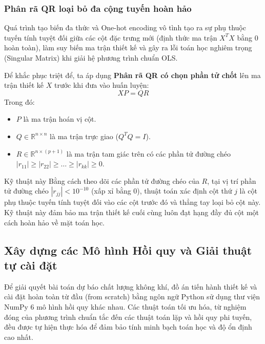 \documentclass[12pt,a4paper]{article}
\begin{document}
\subsubsection{Phân rã QR loại bỏ đa cộng tuyến hoàn hảo}
Quá trình tạo biến đa thức và One-hot encoding vô tình tạo ra sự phụ thuộc tuyến tính tuyệt đối giữa các cột đặc trưng mới (định thức ma trận $X^T X$ bằng 0 hoàn toàn), làm suy biến ma trận thiết kế và gây ra lỗi toán học nghiêm trọng (Singular Matrix) khi giải hệ phương trình chuẩn OLS.

Để khắc phục triệt để, ta áp dụng \textbf{Phân rã QR có chọn phần tử chốt} lên ma trận thiết kế $X$ trước khi đưa vào huấn luyện:
\begin{equation}
    X P = Q R
\end{equation}
Trong đó:
\begin{itemize}
    \item $P$ là ma trận hoán vị cột.
    \item $Q \in \mathbb{R}^{n \times n}$ là ma trận trực giao ($Q^T Q = I$).
    \item $R \in \mathbb{R}^{n \times (p+1)}$ là ma trận tam giác trên có các phần tử đường chéo $|r_{11}| \ge |r_{22}| \ge \dots \ge |r_{kk}| \ge 0$.
\end{itemize} Kỹ thuật này 
Bằng cách theo dõi các phần tử đường chéo của $R$, tại vị trí phần tử đường chéo $|r_{jj}| < 10^{-10}$ (xấp xỉ bằng 0), thuật toán xác định cột thứ $j$ là cột phụ thuộc tuyến tính tuyệt đối vào các cột trước đó và thẳng tay loại bỏ cột này. Kỹ thuật này đảm bảo ma trận thiết kế cuối cùng luôn đạt hạng đầy đủ cột một cách hoàn hảo về mặt toán học.

\subsection{Xây dựng các Mô hình Hồi quy và Giải thuật tự cài đặt}
Để giải quyết bài toán dự báo chất lượng không khí, đồ án tiến hành thiết kế và cài đặt hoàn toàn từ đầu (from scratch) bằng ngôn ngữ Python sử dụng thư viện NumPy 6 mô hình hồi quy khác nhau. Các thuật toán tối ưu hóa, từ nghiệm đóng của phương trình chuẩn tắc đến các thuật toán lặp và hồi quy phi tuyến, đều được tự hiện thực hóa để đảm bảo tính minh bạch toán học và độ ổn định cao nhất.
\end{document}
